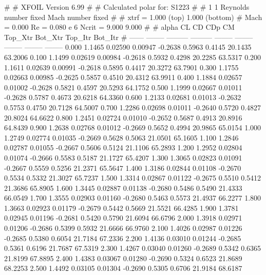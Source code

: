 #  
#       XFOIL         Version 6.99
#  
# Calculated polar for: S1223                                           
#  
# 1 1 Reynolds number fixed          Mach number fixed         
#  
# xtrf =   1.000 (top)        1.000 (bottom)  
# Mach =   0.000     Re =     0.080 e 6     Ncrit =   9.000  9.000
#  
#   alpha    CL        CD       CDp       CM     Top_Xtr  Bot_Xtr  Top_Itr  Bot_Itr
#  ------ -------- --------- --------- -------- -------- -------- -------- --------
   0.000   1.1465   0.02590   0.00947  -0.2638   0.5963   0.4145  20.1435  63.2006
   0.100   1.1499   0.02619   0.00984  -0.2618   0.5932   0.4298  20.2285  63.5317
   0.200   1.1611   0.02639   0.00991  -0.2618   0.5895   0.4417  20.3272  63.7901
   0.300   1.1755   0.02663   0.00985  -0.2625   0.5857   0.4510  20.4312  63.9911
   0.400   1.1884   0.02657   0.01002  -0.2628   0.5821   0.4597  20.5293  64.1752
   0.500   1.1999   0.02667   0.01011  -0.2628   0.5787   0.4673  20.6218  64.3360
   0.600   1.2133   0.02681   0.01013  -0.2632   0.5753   0.4750  20.7128  64.5007
   0.700   1.2286   0.02698   0.01011  -0.2640   0.5720   0.4827  20.8024  64.6622
   0.800   1.2451   0.02724   0.01010  -0.2652   0.5687   0.4913  20.8916  64.8439
   0.900   1.2638   0.02768   0.01012  -0.2669   0.5652   0.4994  20.9865  65.0154
   1.000   1.2749   0.02774   0.01035  -0.2669   0.5628   0.5063  21.0501  65.1605
   1.100   1.2846   0.02787   0.01055  -0.2667   0.5606   0.5124  21.1106  65.2893
   1.200   1.2952   0.02804   0.01074  -0.2666   0.5583   0.5187  21.1727  65.4207
   1.300   1.3065   0.02823   0.01091  -0.2667   0.5559   0.5256  21.2371  65.5647
   1.400   1.3186   0.02844   0.01108  -0.2670   0.5534   0.5332  21.3027  65.7237
   1.500   1.3314   0.02867   0.01122  -0.2675   0.5510   0.5412  21.3686  65.8905
   1.600   1.3445   0.02887   0.01138  -0.2680   0.5486   0.5490  21.4333  66.0549
   1.700   1.3555   0.02903   0.01160  -0.2680   0.5463   0.5573  21.4937  66.2277
   1.800   1.3663   0.02923   0.01179  -0.2679   0.5442   0.5669  21.5521  66.4285
   1.900   1.3781   0.02945   0.01196  -0.2681   0.5420   0.5790  21.6094  66.6796
   2.000   1.3918   0.02971   0.01206  -0.2686   0.5399   0.5932  21.6666  66.9760
   2.100   1.4026   0.02987   0.01226  -0.2685   0.5380   0.6054  21.7184  67.2336
   2.200   1.4136   0.03010   0.01244  -0.2685   0.5361   0.6196  21.7687  67.5319
   2.300   1.4267   0.03040   0.01260  -0.2689   0.5342   0.6365  21.8199  67.8895
   2.400   1.4383   0.03067   0.01280  -0.2690   0.5324   0.6523  21.8689  68.2253
   2.500   1.4492   0.03105   0.01304  -0.2690   0.5305   0.6706  21.9184  68.6187
